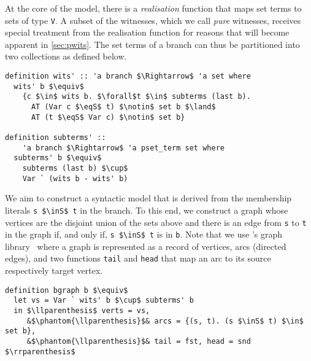 \documentclass[sigplan,10pt,anonymous,review]{acmart}
\newcommand{\inS}{\in_\text{s}}
\newcommand{\eqS}{=_\text{s}}
\begin{document}
At the core of the model, there is a \textit{realisation} function that maps set terms to sets of type \lstinline!V!.
A subset of the witnesses, which we call \textit{pure} witnesses, receives special treatment from the realisation function for reasons that will become apparent in \autoref{sec:pwits}.
The set terms of a branch can thus be partitioned into two collections as defined below.
\begin{lstlisting}
definition wits' :: 'a branch $\Rightarrow$ 'a set where
  wits' b $\equiv$
    {c $\in$ wits b. $\forall$t $\in$ subterms (last b).
      AT (Var c $\eqS$ t) $\notin$ set b $\land$
      AT (t $\eqS$ Var c) $\notin$ set b} 

definition subterms' ::
    'a branch $\Rightarrow$ 'a pset_term set where
  subterms' b $\equiv$
    subterms (last b) $\cup$ 
    Var ` (wits b - wits' b)
\end{lstlisting}

We aim to construct a syntactic model that is derived from the membership literals \lstinline!s $\inS$ t! in the branch.
To this end, we construct a graph whose vertices are the disjoint union of the sets above and there is an edge from \lstinline!s! to \lstinline!t! in the graph if, and only if, \lstinline!s $\inS$ t! is in \lstinline!b!.
Note that we use \citeauthor{graph_theory_afp}'s graph library~\cite{graph_theory_afp} where a graph is represented as a record of vertices, arcs (directed edges), and two functions \lstinline!tail! and \lstinline!head! that map an arc to its source respectively target vertex.
\begin{lstlisting}
definition bgraph b $\equiv$
  let vs = Var ` wits' b $\cup$ subterms' b
  in $\llparenthesis$ verts = vs,
     &$\phantom{\llparenthesis}$& arcs = {(s, t). (s $\inS$ t) $\in$ set b},
     &$\phantom{\llparenthesis}$& tail = fst, head = snd $\rrparenthesis$
\end{lstlisting}
\end{document}
